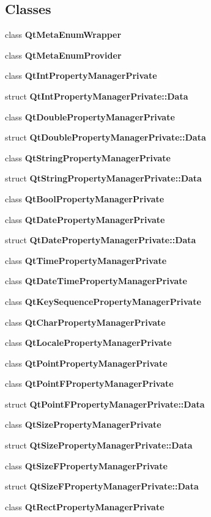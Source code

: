\subsection*{Classes}
\begin{DoxyCompactItemize}
\item 
class {\bf Qt\+Meta\+Enum\+Wrapper}
\item 
class {\bf Qt\+Meta\+Enum\+Provider}
\item 
class {\bf Qt\+Int\+Property\+Manager\+Private}
\item 
struct {\bf Qt\+Int\+Property\+Manager\+Private\+::\+Data}
\item 
class {\bf Qt\+Double\+Property\+Manager\+Private}
\item 
struct {\bf Qt\+Double\+Property\+Manager\+Private\+::\+Data}
\item 
class {\bf Qt\+String\+Property\+Manager\+Private}
\item 
struct {\bf Qt\+String\+Property\+Manager\+Private\+::\+Data}
\item 
class {\bf Qt\+Bool\+Property\+Manager\+Private}
\item 
class {\bf Qt\+Date\+Property\+Manager\+Private}
\item 
struct {\bf Qt\+Date\+Property\+Manager\+Private\+::\+Data}
\item 
class {\bf Qt\+Time\+Property\+Manager\+Private}
\item 
class {\bf Qt\+Date\+Time\+Property\+Manager\+Private}
\item 
class {\bf Qt\+Key\+Sequence\+Property\+Manager\+Private}
\item 
class {\bf Qt\+Char\+Property\+Manager\+Private}
\item 
class {\bf Qt\+Locale\+Property\+Manager\+Private}
\item 
class {\bf Qt\+Point\+Property\+Manager\+Private}
\item 
class {\bf Qt\+Point\+F\+Property\+Manager\+Private}
\item 
struct {\bf Qt\+Point\+F\+Property\+Manager\+Private\+::\+Data}
\item 
class {\bf Qt\+Size\+Property\+Manager\+Private}
\item 
struct {\bf Qt\+Size\+Property\+Manager\+Private\+::\+Data}
\item 
class {\bf Qt\+Size\+F\+Property\+Manager\+Private}
\item 
struct {\bf Qt\+Size\+F\+Property\+Manager\+Private\+::\+Data}
\item 
class {\bf Qt\+Rect\+Property\+Manager\+Private}

\end{DoxyCompactItemize}
